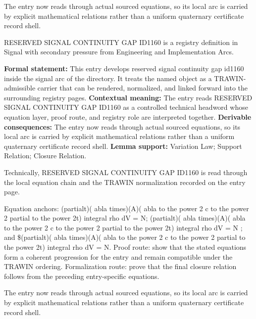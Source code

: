 The entry now reads through actual sourced equations, so its local arc is carried by explicit mathematical relations rather than a uniform quaternary certificate record shell.
\clearpage


\begingroup\small
{}
RESERVED SIGNAL CONTINUITY GAP ID1160 is a registry definition in Signal with secondary pressure from Engineering and Implementation Arcs.

\begingroup\footnotesize\setlength{\emergencystretch}{3em}\sloppy
\textbf{Formal statement:} This entry develops reserved signal continuity gap id1160 inside the signal arc of the directory. It treats the named object as a TRAWIN-admissible carrier that can be rendered, normalized, and linked forward into the surrounding registry pages. \textbf{Contextual meaning:} The entry reads RESERVED SIGNAL CONTINUITY GAP ID1160 as a controlled technical headword whose equation layer, proof route, and registry role are interpreted together. \textbf{Derivable consequences:} The entry now reads through actual sourced equations, so its local arc is carried by explicit mathematical relations rather than a uniform quaternary certificate record shell. \textbf{Lemma support:} Variation Law; Support Relation; Closure Relation.\par
\endgroup

Technically, RESERVED SIGNAL CONTINUITY GAP ID1160 is read through the local equation chain and the TRAWIN normalization recorded on the entry page.

Equation anchors: (partialt)( abla times)(A)( abla to the power 2   c to the power  2 partial to the power 2t) integral rho dV = N; (partialt)( abla times)(A)( abla to the power 2   c to the power  2 partial to the power 2t) integral rho dV = N ; and \$(partialt)( abla times)(A)( abla to the power 2   c to the power  2 partial to the power 2t) integral rho dV = N. Proof route: show that the stated equations form a coherent progression for the entry and remain compatible under the TRAWIN ordering. Formalization route: prove that the final closure relation follows from the preceding entry-specific equations.

The entry now reads through actual sourced equations, so its local arc is carried by explicit mathematical relations rather than a uniform quaternary certificate record shell.
\endgroup

